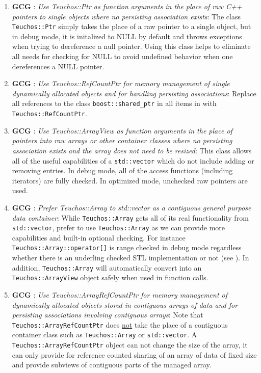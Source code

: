 \begin{enumerate}
{}\item{}\textbf{GCG }:
{}\textit{Use Teuchos::Ptr as function arguments in the place of raw C++
pointers to single objects where no persisting association exists}: The class
{}\texttt{Teuchos\-::Ptr} simply takes the place of a raw pointer to a single
object, but in debug mode, it is initalized to NULL by default and throws
exceptions when trying to dereference a null pointer.  Using this class helps
to eliminate all needs for checking for NULL to avoid undefined behavior when
one dereferences a NULL pointer.

{}\item{}\textbf{GCG }:
{}\textit{Use Teuchos::RefCountPtr for memory management of single
dynamically allocated objects and for handling persisting
{}\cite{RefCountPtrBeginnersGuide} associations}: Replace all references to
the class {}\texttt{boost::\-shared\_ptr} in all items in
{}\cite{C++CodingStandards05} with {}\texttt{Teuchos::\-RefCountPtr}.

{}\item{}\textbf{GCG }:
{}\textit{Use Teuchos::ArrayView as function arguments in the place of
pointers into raw arrays or other container classes where no persisting
association exists and the array does not need to be resized}: This class
allows all of the useful capabilities of a {}\texttt{std::vector} which do not
include adding or removing entries.  In debug mode, all of the access
functions (including iterators) are fully checked.  In optimized mode,
unchecked raw pointers are used.

{}\item{}\textbf{GCG }:
{}\textit{Prefer Teuchos::Array to std::vector as a contiguous general
purpose data container}: While {}\texttt{Teuchos::\-Array} gets all of its
real functionality from {}\texttt{std::\-vector}, prefer to use
{}\texttt{Teuchos::\-Array} as we can provide more capabilities and built-in
optional checking.  For instance {}\texttt{Teuchos::\-Array::\-operator[]} is
range checked in debug mode regardless whether there is an underling checked
STL implementation or not (see {}\cite[Item 83]{C++CodingStandards05}).  In
addition, {}\texttt{Teuchos\-::Array} will automatically convert into an
{}\texttt{Teuchos\-::ArrayView} object safely when used in function calls.

{}\item{}\textbf{GCG }:
{}\textit{Use Teuchos::ArrayRefCountPtr for memory management of
dynamically allocated objects stored in contiguous arrays of data and for
persisting associations involving contiguous arrays}: Note that
{}\texttt{Teuchos::ArrayRefCountPtr} does {}\underline{not} take the place of
a contiguous container class such as {}\texttt{Teuchos::\-Array} or
{}\texttt{std::\-vector}.  A {}\texttt{Teuchos::ArrayRefCountPtr} object can
not change the size of the array, it can only provide for reference counted
sharing of an array of data of fixed size and provide subviews of contiguous
parts of the managed array.


\end{enumerate}
